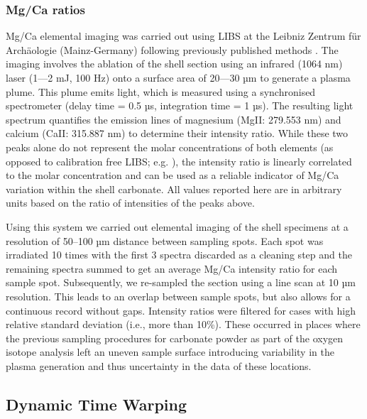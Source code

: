 \documentclass[
  authoryear,
  preprint,
  3p]{elsarticle}
\begin{document}
\subsubsection{Mg/Ca ratios}\label{mgca-ratios}

Mg/Ca elemental imaging was carried out using LIBS at the Leibniz
Zentrum für Archäologie (Mainz-Germany) following previously published
methods \citep{Hausmann2023-ih}. The imaging involves the ablation of
the shell section using an infrared (1064 nm) laser (1---2 mJ, 100 Hz)
onto a surface area of 20---30 µm to generate a plasma plume. This plume
emits light, which is measured using a synchronised spectrometer (delay
time = 0.5 µs, integration time = 1 µs). The resulting light spectrum
quantifies the emission lines of magnesium (MgII: 279.553 nm) and
calcium (CaII: 315.887 nm) to determine their intensity ratio. While
these two peaks alone do not represent the molar concentrations of both
elements (as opposed to calibration free LIBS; e.g.
\citep{Martinez-Minchero2023-pq}), the intensity ratio is linearly
correlated to the molar concentration \citep{Hausmann2017-oa} and can be
used as a reliable indicator of Mg/Ca variation within the shell
carbonate. All values reported here are in arbitrary units based on the
ratio of intensities of the peaks above.

Using this system we carried out elemental imaging of the shell
specimens at a resolution of 50--100 µm distance between sampling spots.
Each spot was irradiated 10 times with the first 3 spectra discarded as
a cleaning step and the remaining spectra summed to get an average Mg/Ca
intensity ratio for each sample spot. Subsequently, we re-sampled the
section using a line scan at 10 µm resolution. This leads to an overlap
between sample spots, but also allows for a continuous record without
gaps. Intensity ratios were filtered for cases with high relative
standard deviation (i.e., more than 10\%). These occurred in places
where the previous sampling procedures for carbonate powder as part of
the oxygen isotope analysis left an uneven sample surface introducing
variability in the plasma generation and thus uncertainty in the data of
these locations.

\subsection{Dynamic Time Warping}\label{dynamic-time-warping}
\end{document}
